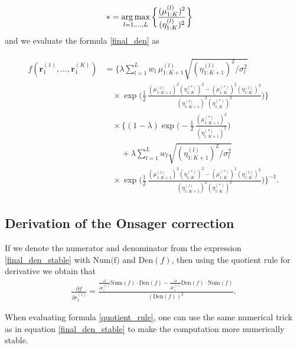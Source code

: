 \begin{align}
    * &= \operatorname*{arg\,max}_{l=1,\dots, L} \bigg \{ \frac{(\mu^{(l)}_{1:K})^2}{(\eta^{(l)}_{1:K})^2} \bigg \}
\end{align}
and we evaluate the formula \eqref{final_den} as

\begin{align}
    \label{final_den_stable}
    \begin{split}
    f(\textbf{r}_1^{(1)}, \dots, \textbf{r}_1^{(K)}) & = \Bigg\{ \lambda \sum_{l=1}^L w_l \, \mu_{1:K+1}^{(l)} \sqrt{(\eta^{(l)}_{1:K+1})^2 / \sigma_l^2} \\
    & \quad \times \exp \bigg( \frac{1}{2} \, \frac{(\mu^{(l)}_{1:K+1})^2 (\eta^{(*)}_{1:K})^2 - (\mu^{(*)}_{1:K})^2 (\eta^{(l)}_{1:K})^2}{(\eta^{(l)}_{1:K+1})^2 (\eta^{(*)}_{1:K})^2} \bigg) \Bigg\} \\
    & \quad \times \Bigg\{ (1-\lambda) \exp \bigg( -\frac{1}{2} \, \frac{(\mu^{(*)}_{1:K+1})^2}{(\eta^{(*)}_{1:K+1})^2} \bigg) \\
    & \qquad + \lambda \sum_{l=1}^L w_l \sqrt{(\eta^{(l)}_{1:K+1})^2 / \sigma_l^2} \\
    & \quad \times \exp \bigg( \frac{1}{2} \, \frac{(\mu^{(l)}_{1:K+1})^2 (\eta^{(*)}_{1:K})^2 - (\mu^{(*)}_{1:K})^2 (\eta^{(l)}_{1:K})^2}{(\eta^{(l)}_{1:K+1})^2 (\eta^{(*)}_{1:K})^2} \bigg) \Bigg\}^{-1}.
    \end{split}
\end{align}

\subsection*{Derivation of the Onsager correction}
If we denote the numerator and denominator from the expression \eqref{final_den_stable} with $\text{Num(f)}$ and $\text{Den}(f)$, then using the quotient rule for derivative we obtain that
\begin{align}
    \label{quotient_rule}
    \frac{\partial f}{\partial r_1^{(i)}} =\frac{\frac{\partial}{\partial r_1^{(i)}}\text{Num}(f) \cdot \text{Den}(f) - \frac{\partial}{\partial r_1^{(i)}}\text{Den}(f) \cdot \text{Num}(f)}{(\text{Den}(f))^2}. 
\end{align}

When evaluating formula \eqref{quotient_rule}, one can use the same numerical trick as in equation \eqref{final_den_stable} to make the computation more numerically stable.

